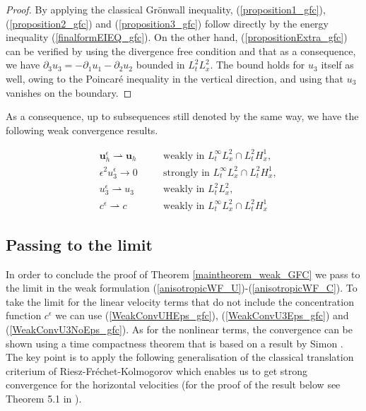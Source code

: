 \documentclass[12pt]{report}
\numberwithin{theorem}{chapter}
\numberwithin{corollary}{chapter}
\numberwithin{lemma}{chapter}
\numberwithin{remark}{chapter}
\numberwithin{definition}{chapter}
\numberwithin{prop}{chapter}
\begin{document}
  \begin{proof}
  By applying the classical Gr\"onwall inequality, (\ref{proposition1_gfc}), (\ref{proposition2_gfc}) and (\ref{proposition3_gfc}) follow directly by the energy inequality (\ref{finalformEIEQ_gfc}). On the other hand, (\ref{propositionExtra_gfc}) can be verified by using the divergence free condition and that as a consequence, we have $\partial_3 u_3 = - \partial_1 u_1 - \partial_2 u_2$ bounded in $L^2_t L^2 _x$. The bound holds for $u_3$ itself as well, owing to the Poincar\'e inequality in the vertical direction, and using that $u_3$ vanishes on the boundary.
  \end{proof}
  
  As a consequence, up to subsequences still denoted by the same way, we have the following weak convergence results.
  
  \begin{align} 
    &  \mathbf{u}_h^\epsilon \rightharpoonup \mathbf{u}_h &\quad & \text{weakly in $L_t^\infty L_x^2 \cap L_t^2 H_x^1$,} \label{WeakConvUHEps_gfc} \\
    &  \epsilon^2 u_3^\epsilon \to 0 &\quad & \text{strongly in $L_t^\infty L_x^2 \cap L_t^2 H_x^1$,} \label{WeakConvU3Eps_gfc} \\ 
    & u_3^\epsilon \rightharpoonup u_3  &\quad & \text{weakly in $L_t^2 L_x^2$,} \label{WeakConvU3NoEps_gfc} \\
    & c^\epsilon \rightharpoonup c &\quad & \text{weakly in $L_t^\infty L_x^2 \cap L_t^2 H_x^1$} \label{WeakConvCEps1_gfc}
  \end{align} 

\subsection{Passing to the limit}

In order to conclude the proof of Theorem \ref{maintheorem_weak_GFC} we pass to the limit in the weak formulation (\ref{anisotropicWF_U})-(\ref{anisotropicWF_C}). To take the limit for the linear velocity terms that do not include the concentration function $c^\epsilon$ we can use (\ref{WeakConvUHEps_gfc}), (\ref{WeakConvU3Eps_gfc}) and (\ref{WeakConvU3NoEps_gfc}). As for the nonlinear terms, the convergence can be shown using a time compactness theorem that is based on a result by Simon \cite{simon1986compact}. The key point is to apply the following generalisation of the classical translation criterium of Riesz-Fr\'echet-Kolmogorov which enables us to get strong convergence for the horizontal velocities (for the proof of the result below see Theorem 5.1 in \cite{azerad2001mathematical}).
\end{document}
